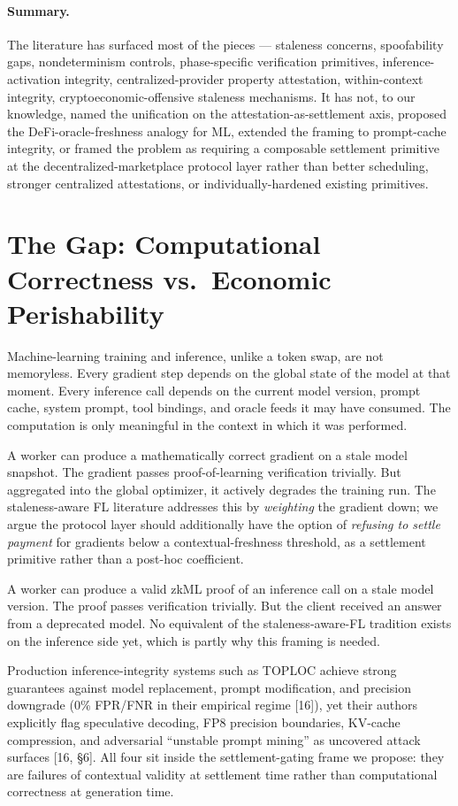 \documentclass[11pt]{article}
\begin{document}
\paragraph{Summary.} The literature has surfaced most of the pieces --- staleness concerns, spoofability gaps, nondeterminism controls, phase-specific verification primitives, inference-activation integrity, centralized-provider property attestation, within-context integrity, cryptoeconomic-offensive staleness mechanisms. It has not, to our knowledge, named the unification on the attestation-as-settlement axis, proposed the DeFi-oracle-freshness analogy for ML, extended the framing to prompt-cache integrity, or framed the problem as requiring a composable settlement primitive at the decentralized-marketplace protocol layer rather than better scheduling, stronger centralized attestations, or individually-hardened existing primitives.

\section{The Gap: Computational Correctness vs.\ Economic Perishability}

Machine-learning training and inference, unlike a token swap, are not memoryless. Every gradient step depends on the global state of the model at that moment. Every inference call depends on the current model version, prompt cache, system prompt, tool bindings, and oracle feeds it may have consumed. The computation is only meaningful in the context in which it was performed.

A worker can produce a mathematically correct gradient on a stale model snapshot. The gradient passes proof-of-learning verification trivially. But aggregated into the global optimizer, it actively degrades the training run. The staleness-aware FL literature addresses this by \emph{weighting} the gradient down; we argue the protocol layer should additionally have the option of \emph{refusing to settle payment} for gradients below a contextual-freshness threshold, as a settlement primitive rather than a post-hoc coefficient.

A worker can produce a valid zkML proof of an inference call on a stale model version. The proof passes verification trivially. But the client received an answer from a deprecated model. No equivalent of the staleness-aware-FL tradition exists on the inference side yet, which is partly why this framing is needed.

Production inference-integrity systems such as TOPLOC achieve strong guarantees against model replacement, prompt modification, and precision downgrade (0\% FPR/FNR in their empirical regime [16]), yet their authors explicitly flag speculative decoding, FP8 precision boundaries, KV-cache compression, and adversarial ``unstable prompt mining'' as uncovered attack surfaces [16, \S6]. All four sit inside the settlement-gating frame we propose: they are failures of contextual validity at settlement time rather than computational correctness at generation time.
\end{document}
